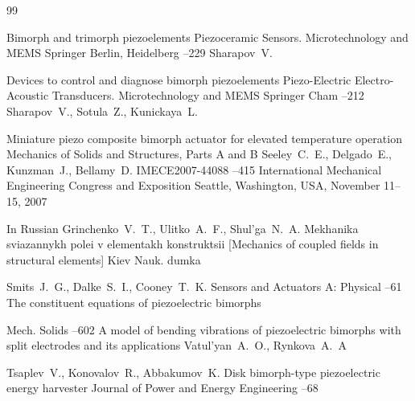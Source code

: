 


\begin{thebibliography}{99}

\paper  Bimorph and trimorph piezoelements
\inbook  Piezoceramic Sensors. Microtechnology and MEMS
\publ Springer
\publaddr Berlin, Heidelberg
--229
\by Sharapov~V.

\paper  Devices to control and diagnose bimorph piezoelements
\inbook  Piezo-Electric Electro-Acoustic Transducers. Microtechnology and MEMS
\publ Springer
\publaddr Cham
--212
\by Sharapov~V., Sotula~Z., Kunickaya~L.


\paper  Miniature piezo composite bimorph actuator for elevated temperature operation
\volinfo Mechanics of Solids and Structures, Parts A and B
\by Seeley~C.~E., Delgado~E., Kunzman~J., Bellamy~D.
\papernumber IMECE2007-44088
--415
\inbook International Mechanical Engineering Congress and Exposition
\procinfo Seattle, Washington, USA, November 11–15, 2007


\lang In Russian
\by Grinchenko~V.~T., Ulitko~A.~F., Shul'ga~N.~A.
\book Mekhanika sviazannykh polei v elementakh konstruktsii \rm [Mechanics of coupled fields in structural elements]
\publaddr Kiev
\publ Nauk. dumka

\by Smits~J.~G., Dalke~S.~I., Cooney~T.~K.
\jour Sensors and Actuators A: Physical
--61
\paper The constituent equations of piezoelectric bimorphs

\jour Mech. Solids 
–602
\paper A model of bending vibrations of piezoelectric bimorphs with split electrodes and its applications
\by Vatul'yan~A.~O., Rynkova~A.~A



\by Tsaplev~V., Konovalov~R., Abbakumov~K.
\paper Disk bimorph-type piezoelectric  energy harvester
\jour  Journal of Power and Energy Engineering
--68


\end{thebibliography}
